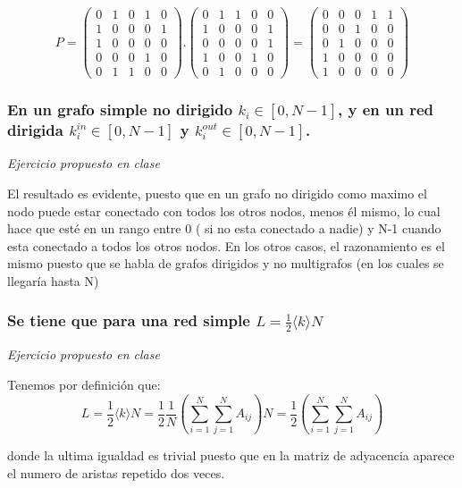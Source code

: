 $$P=\begin{pmatrix}
0 & 1 & 0 & 1 & 0 \\ 
1 & 0 & 0 & 0 & 1 \\ 
1 & 0 & 0 & 0 & 0 \\ 
0 & 0 & 0 & 1 & 0 \\ 
0 & 1 & 1 & 0 & 0
\end{pmatrix}.\begin{pmatrix}
0 & 1 & 1 & 0 & 0 \\ 
1 & 0 & 0 & 0 & 1 \\ 
0 & 0 & 0 & 0 & 1 \\ 
1 & 0 & 0 & 1 & 0 \\ 
0 & 1 & 0 & 0 & 0
\end{pmatrix}= 
\begin{pmatrix}
0 & 0 & 0 & 1 & 1 \\ 
0 & 0 & 1 & 0 & 0 \\ 
0 & 1 & 0 & 0 & 0 \\ 
1 & 0 & 0 & 0 & 0 \\ 
1 & 0 & 0 & 0 & 0
\end{pmatrix} $$ 

\subsubsection{\large En un grafo simple no dirigido $k_i \in [0, N - 1]$, y en un red dirigida $k_i^{in}\in[0, N - 1]$ y $k_i^{out} \in [0, N - 1]$.}
\textit{Ejercicio propuesto en clase}

El resultado es evidente, puesto que en un grafo no dirigido como maximo el nodo puede estar conectado con todos los otros nodos, menos él mismo, lo cual hace que esté en un rango entre 0 ( si no esta conectado a nadie) y N-1 cuando esta conectado a todos los otros nodos.
En los otros casos, el razonamiento es el mismo puesto que se habla de grafos dirigidos y no multigrafos (en los cuales se llegaría hasta N)

\subsubsection{\large Se tiene que para una red simple $L=\frac{1}{2}\langle k\rangle N$}
\textit{Ejercicio propuesto en clase}

Tenemos por definición que: 
$$L=\frac{1}{2}\langle k\rangle N=\frac{1}{2}\frac{1}{N}(\sum_{i=1}^{N}\sum_{j=1}^{N}A_{ij}) N=\frac{1}{2}(\sum_{i=1}^{N}\sum_{j=1}^{N}A_{ij}) $$

donde la ultima igualdad es trivial puesto que en la matriz de adyacencia aparece el numero de aristas repetido dos veces.


